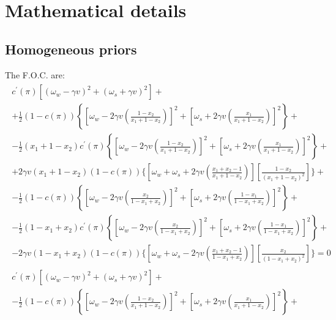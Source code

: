 \documentclass[12pt,a4paper]{article}
\begin{document}
\newpage



\appendix

\section{Mathematical details}
\label{math}

\subsection{Homogeneous priors}
The F.O.C. are:
\begin{eqnarray}
\label{focx1gen}
    \begin{split}
        c^\prime(\pi)\left[(\omega_w-\gamma v)^2+(\omega_s+\gamma v)^2\right]+ \\
        +\frac{1}{2}(1-c(\pi))\left\{\left[\omega_w-2\gamma v\left(\frac{1-x_2}{x_1+1-x_2}\right)\right]^2+\left[\omega_s+2\gamma v\left(\frac{x_1}{x_1+1-x_2}\right)\right]^2\right\}+ \\
        -\frac{1}{2}(x_1 + 1-x_2)c^\prime(\pi)\left\{\left[\omega_w-2\gamma v\left(\frac{1-x_2}{x_1+1-x_2}\right)\right]^2+\left[\omega_s+2\gamma v\left(\frac{x_1}{x_1+1-x_2}\right)\right]^2\right\}+ \\
        +2\gamma v(x_1 + 1-x_2)(1-c(\pi))\Bigg\{\left[\omega_w+\omega_s+2\gamma v\left(\frac{x_1+x_2-1}{x_1+1-x_2}\right)\right]\left[\frac{1-x_2}{(x_1+1-x_2)^2}\right]\Bigg\}+\\
        -\frac{1}{2}(1-c(\pi))\left\{\left[\omega_w-2\gamma v\left(\frac{x_2}{1-x_1+x_2}\right)\right]^2+\left[\omega_s+2\gamma v\left(\frac{1-x_1}{1-x_1+x_2}\right)\right]^2\right\}+\\
        -\frac{1}{2}(1-x_1 + x_2)c^\prime(\pi)\left\{\left[\omega_w-2\gamma v\left(\frac{x_2}{1-x_1+x_2}\right)\right]^2+\left[\omega_s+2\gamma v\left(\frac{1-x_1}{1-x_1+x_2}\right)\right]^2\right\}+\\
        -2\gamma v(1-x_1 + x_2)(1-c(\pi))\Bigg\{\left[\omega_w+\omega_s-2\gamma v\left(\frac{x_1+x_2-1}{1-x_1+x_2}\right)\right]\left[\frac{x_2}{(1-x_1+x_2)^2}\right]\Bigg\}=0
    \end{split} \\
    \label{focx2gen}
    \begin{split}
        c^\prime(\pi)\left[(\omega_w-\gamma v)^2+(\omega_s+\gamma v)^2\right]+ \\
        -\frac{1}{2}(1-c(\pi))\left\{\left[\omega_w-2\gamma v\left(\frac{1-x_2}{x_1+1-x_2}\right)\right]^2+\left[\omega_s+2\gamma v\left(\frac{x_1}{x_1+1-x_2}\right)\right]^2\right\}+ \\

\end{split}
\end{eqnarray}
\end{document}
